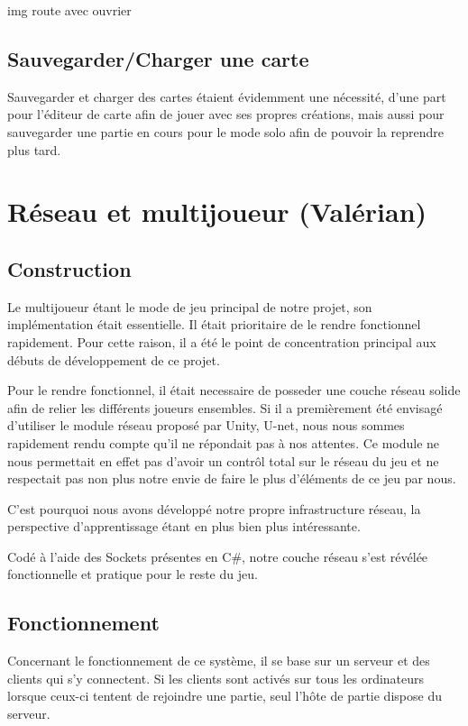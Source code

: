 \documentclass[12pt]{report}
\begin{document}
img route avec ouvrier

\subsection{Sauvegarder/Charger une carte}

Sauvegarder et charger des cartes étaient évidemment une nécessité, d’une part
pour l’éditeur de carte afin de jouer avec ses propres créations, mais aussi
pour sauvegarder une partie en cours pour le mode solo afin de pouvoir la
reprendre plus tard.

\section{Réseau et multijoueur (Valérian)}

\subsection{Construction}

Le multijoueur étant le mode de jeu principal de notre projet, son
implémentation était essentielle. Il était prioritaire de le rendre fonctionnel
rapidement. Pour cette raison, il a été le point de concentration principal aux
débuts de développement de ce projet.

Pour le rendre fonctionnel, il était necessaire de posseder une couche réseau
solide afin de relier les différents joueurs ensembles. Si il a premièrement été
envisagé d’utiliser le module réseau proposé par Unity, U-net, nous nous sommes
rapidement rendu compte qu’il ne répondait pas à nos attentes. Ce module ne nous
permettait en effet pas d’avoir un contrôl total sur le réseau du jeu et ne
respectait pas non plus notre envie de faire le plus d’éléments de ce jeu par
nous.

C’est pourquoi nous avons développé notre propre infrastructure réseau, la
perspective d’apprentissage étant en plus bien plus intéressante.

Codé à l’aide des Sockets présentes en C\#, notre couche réseau s’est révélée
fonctionnelle et pratique pour le reste du jeu. 

\subsection{Fonctionnement}

Concernant le fonctionnement de ce système, il se base sur un serveur et des
clients qui s’y connectent. Si les clients sont activés sur tous les ordinateurs
lorsque ceux-ci tentent de rejoindre une partie, seul l’hôte de partie dispose
du serveur. 
\end{document}
